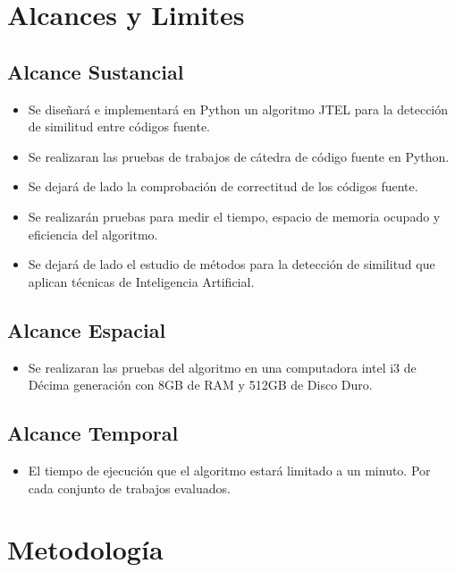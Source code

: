\section{Alcances y Limites}
\subsection{Alcance Sustancial}
\begin{itemize}
    \item Se diseñará e implementará en Python un algoritmo JTEL para la detección de similitud entre códigos fuente.
    \item Se realizaran las pruebas de trabajos de cátedra de código fuente en Python.
    \item Se dejará de lado la comprobación de correctitud de los códigos fuente.
    \item Se realizarán pruebas para medir el tiempo, espacio de memoria ocupado y eficiencia del algoritmo.
    \item Se dejará de lado el estudio de métodos para la detección de similitud que aplican técnicas de Inteligencia Artificial.
\end{itemize}
\subsection{Alcance Espacial}
\begin{itemize}
    \item Se realizaran las pruebas del algoritmo en una computadora intel i3 de Décima generación con 8GB de RAM y 512GB de Disco Duro.
\end{itemize}
\subsection{Alcance Temporal}
\begin{itemize}
    \item El tiempo de ejecución que el algoritmo estará limitado a un minuto. Por cada conjunto de trabajos evaluados.
\end{itemize}
\section{Metodología}
